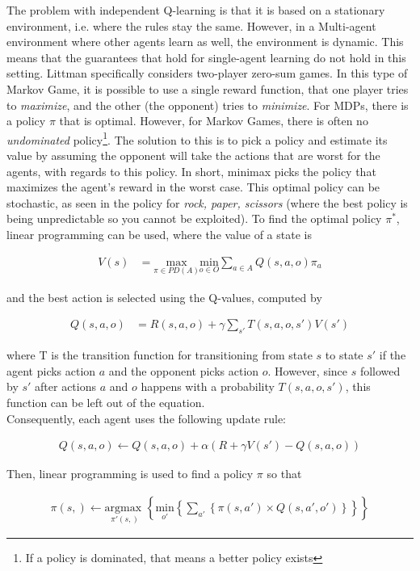 The problem with independent Q-learning is that it is based on a stationary environment, i.e. where the rules stay the same. However, in a Multi-agent environment where other agents learn as well, the environment is dynamic. This means that the guarantees that hold for single-agent learning do not hold in this setting. Littman \cite{Littman94markovgames} specifically considers two-player zero-sum games. In this type of Markov Game, it is possible to use a single reward function, that one player tries to \textit{maximize}, and the other (the opponent) tries to \textit{minimize}. For MDPs, there is a policy $\pi$ that is optimal. However, for Markov Games, there is often no \textit{undominated} policy\footnote{If a policy is dominated, that means a better policy exists}. The solution to this is to pick a policy and estimate its value by assuming the opponent will take the actions that are worst for the agents, with regards to this policy. In short, minimax picks the policy that maximizes the agent's reward in the worst case. This optimal policy can be stochastic, as seen in the policy for \textit{rock, paper, scissors} (where the best policy is being unpredictable so you cannot be exploited). To find the optimal policy $\pi^*$, linear programming can be used, where the value of a state is
\begin{mdframed}
\begin{align}
V(s) &= \underset{\pi \in PD(A)}{\text{max}} \underset{o \in O}{\text{min}} \sum_{a\in A} Q(s,a,o) \pi_a
\end{align}
\end{mdframed}
and the best action is selected using the Q-values, computed by
\begin{mdframed}
\begin{align}
Q(s,a,o) &= R(s,a,o) + \gamma \sum_{s'} T(s,a,o,s') V(s')
\end{align}
\end{mdframed}
where T is the transition function for transitioning from state $s$ to state $s'$ if the agent picks action $a$ and the opponent picks action $o$. However, since $s$ followed by $s'$ after actions $a$ and $o$ happens with a probability $T(s,a,o,s')$, this function can be left out of the equation.\\

Consequently, each agent uses the following update rule:
\begin{mdframed}
\begin{align}
Q(s,a,o) \leftarrow Q(s,a,o) + \alpha (R + \gamma V(s') - Q(s,a,o))
\end{align}
\label{ref:minimaxrule}
\end{mdframed}
Then, linear programming is used to find a policy $\pi$ so that
\begin{mdframed}
\begin{align}
\pi(s,) \leftarrow \underset{\pi'(s,)}{\text{argmax }} \left\{ \underset{o'}{\text{min}} \left\{ \sum_{a'}  \left\{ \pi(s,a') \times Q(s,a',o') \right\} \right\} \right\}
\end{align}
\end{mdframed}



